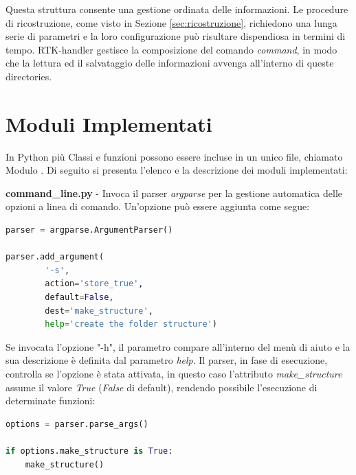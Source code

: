 \documentclass[a4paper,12pt, doubleside]{report}
\begin{document}
                Questa struttura consente una gestione ordinata delle informazioni. Le procedure di ricostruzione, come visto in Sezione \ref{sec:ricostruzione}, richiedono una lunga serie di parametri e la loro configurazione può risultare dispendiosa in termini di tempo. RTK-handler gestisce la composizione del comando \textit{command}, in modo che la lettura ed il salvataggio delle informazioni avvenga all'interno di queste directories.         
    
        \section{Moduli Implementati}
            \par
                In Python più Classi e funzioni possono essere incluse in un unico file, chiamato Modulo \cite{python-modules}. Di seguito si presenta l'elenco e la descrizione dei moduli implementati:
            
            \bigskip
            \par
                \textbf{command\_line.py} - Invoca il parser \textit{argparse} per la gestione automatica delle opzioni a linea di comando. Un'opzione può essere aggiunta come segue:
                
                \begin{lstlisting}[language=python, frame=bt]
parser = argparse.ArgumentParser()

parser.add_argument(
        '-s', 
        action='store_true', 
        default=False,
        dest='make_structure',
        help='create the folder structure')
                \end{lstlisting}
                
                Se invocata l'opzione "-h", il parametro compare all'interno del menù di aiuto e la sua descrizione è definita dal parametro \textit{help}. Il parser, in fase di esecuzione, controlla se l'opzione è stata attivata, in questo caso l'attributo \textit{make\_structure} assume il valore \textit{True} (\textit{False} di default), rendendo possibile l'esecuzione di determinate funzioni:
                
                \begin{lstlisting}[language=python, frame=bt]
options = parser.parse_args()
                
if options.make_structure is True:
    make_structure()
                \end{lstlisting}
               
\end{document}
